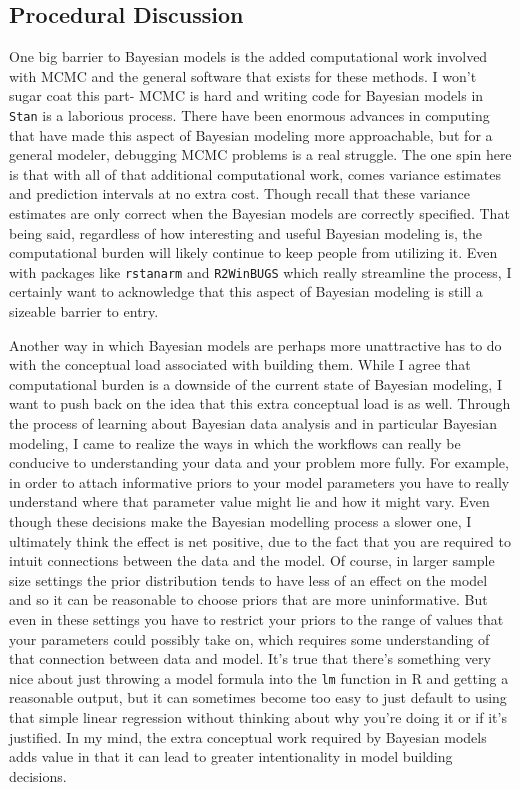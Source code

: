 \documentclass[12pt,twoside]{reedthesis}
\begin{document}
\hypertarget{procedural-discussion}{%
\subsection{Procedural Discussion}\label{procedural-discussion}}

One big barrier to Bayesian models is the added computational work involved with MCMC and the general software that exists for these methods. I won't sugar coat this part- MCMC is hard and writing code for Bayesian models in \texttt{Stan} is a laborious process. There have been enormous advances in computing that have made this aspect of Bayesian modeling more approachable, but for a general modeler, debugging MCMC problems is a real struggle. The one spin here is that with all of that additional computational work, comes variance estimates and prediction intervals at no extra cost. Though recall that these variance estimates are only correct when the Bayesian models are correctly specified. That being said, regardless of how interesting and useful Bayesian modeling is, the computational burden will likely continue to keep people from utilizing it. Even with packages like \texttt{rstanarm} and \texttt{R2WinBUGS} which really streamline the process, I certainly want to acknowledge that this aspect of Bayesian modeling is still a sizeable barrier to entry.

Another way in which Bayesian models are perhaps more unattractive has to do with the conceptual load associated with building them. While I agree that computational burden is a downside of the current state of Bayesian modeling, I want to push back on the idea that this extra conceptual load is as well. Through the process of learning about Bayesian data analysis and in particular Bayesian modeling, I came to realize the ways in which the workflows can really be conducive to understanding your data and your problem more fully. For example, in order to attach informative priors to your model parameters you have to really understand where that parameter value might lie and how it might vary. Even though these decisions make the Bayesian modelling process a slower one, I ultimately think the effect is net positive, due to the fact that you are required to intuit connections between the data and the model. Of course, in larger sample size settings the prior distribution tends to have less of an effect on the model and so it can be reasonable to choose priors that are more uninformative. But even in these settings you have to restrict your priors to the range of values that your parameters could possibly take on, which requires some understanding of that connection between data and model. It's true that there's something very nice about just throwing a model formula into the \texttt{lm} function in R and getting a reasonable output, but it can sometimes become too easy to just default to using that simple linear regression without thinking about why you're doing it or if it's justified. In my mind, the extra conceptual work required by Bayesian models adds value in that it can lead to greater intentionality in model building decisions.
\end{document}
